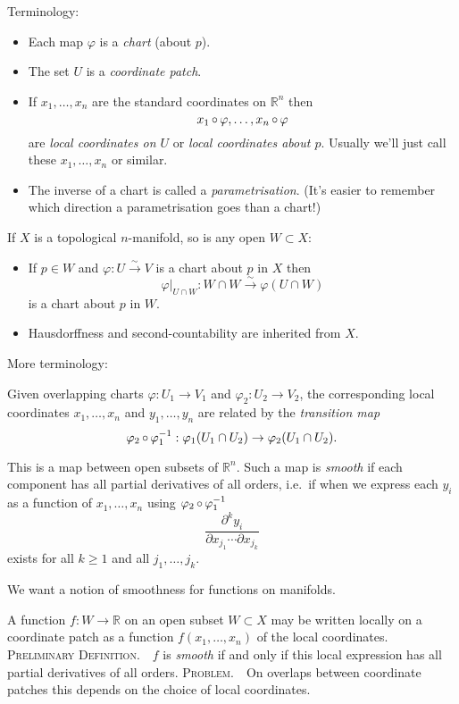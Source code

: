 \documentclass[a4paper,11pt]{article}
\begin{document}
	Terminology:
	\begin{itemize}
		\item Each map $\varphi$ is a \emph{chart} (about $p$).
		\item The set $U$ is a \emph{coordinate patch}.
		\item If $x_1, \dots, x_n$ are the standard coordinates on $\mathbb{R}^n$ then
		\[
			x_1 \operatorname{\circ} \varphi, \dots , x_n \operatorname{\circ} \varphi
		\]
		are \emph{local coordinates on $U$} or \emph{local coordinates about $p$}. Usually we'll just call these $x_1, \dots , x_n$ or similar.
		\item The inverse of a chart is called a \emph{parametrisation}. (It's easier to remember which direction a parametrisation goes than a chart!)
	\end{itemize}

	\begin{ex}
		If $X$ is a topological $n$-manifold, so is any open $W \subset X$:
		\begin{itemize}
			\item If $p \in W$ and $\varphi: U \xrightarrow{\sim} V$ is a chart about $p$ in $X$ then \[
				\varphi|_{U \cap W}: W \cap W \xrightarrow{\sim} \varphi(U \cap W)
			\]
			is a chart about $p$ in $W$.
			\item Hausdorffness and second-countability are inherited from $X$.
		\end{itemize}
	\end{ex}

	More terminology:

	Given overlapping charts $\varphi: U_1 \to V_1$ and $\varphi_2 : U_2 \to V_2$, the corresponding local coordinates $x_1, \dots , x_n$ and $y_1, \dots, y_n$ are related by the \emph{transition map}
	\[
		\varphi_2 \operatorname{\circ} \varphi_1^{-1} : \varphi_1 (U_1 \cap U_2) \to \varphi_2 (U_1 \cap U_2).
	\]

	
	This is a map between open subsets of $\mathbb{R}^n$. Such a map is \emph{smooth} if each component has all partial derivatives of all orders, i.e.\ if when we express each $y_i$ as a function of $x_1, \dots , x_n$ using $\varphi_2 \operatorname{\circ} \varphi_1^{-1}$ 
	\[
		\frac{\partial^k y_i}{\partial x_{j_1} \cdots \partial x_{j_k}}
	\]
	exists for all $k \geq 1$ and all $j_1, \dots , j_k$.

	We want a notion of smoothness for functions on manifolds.

	A function $f: W \to \mathbb{R}$ on an open subset $W \subset X$ may be written locally on a coordinate patch as a function $f(x_1,\dots,x_n)$ of the local coordinates.
	{\large \scshape Preliminary Definition.}\ \ $f$ is \emph{smooth} if and only if this local expression has all partial derivatives of all orders.
	{\large \scshape Problem.}\ \ On overlaps between coordinate patches this depends on the choice of local coordinates.
\end{document}
